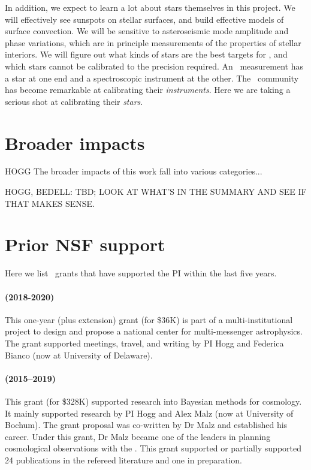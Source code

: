 \documentclass[12pt, letterpaper]{article}
\begin{document}
In addition, we expect to learn a lot about stars themselves in this project.
We will effectively see sunspots on stellar surfaces, and build effective models
of surface convection.
We will be sensitive to asteroseismic mode amplitude and phase variations, which
are in principle measurements of the properties of stellar interiors.
We will figure out what kinds of stars are the best targets for \EPRV, and which
stars cannot be calibrated to the precision required.
An \EPRV\ measurement has a star at one end and a spectroscopic instrument at the other.
The \EPRV\ community has become remarkable at calibrating their \emph{instruments}.
Here we are taking a serious shot at calibrating their \emph{stars}.

\section{Broader impacts}

HOGG The broader impacts of this work fall into various categories...

HOGG, BEDELL: TBD; LOOK AT WHAT'S IN THE SUMMARY AND SEE IF THAT MAKES SENSE.

\section{Prior NSF support}

Here we list \NSF\ grants that have supported the PI within the last five years.

\paragraph{
 (2018-2020)}
This one-year (plus extension) grant (for \$36K) is part of a multi-institutional project
to design and propose a national center for multi-messenger astrophysics. The grant supported
meetings, travel, and writing by PI Hogg and Federica Bianco (now at University of Delaware).

\paragraph{
(2015--2019)} This grant (for \$328K) supported research into Bayesian
methods for cosmology. It mainly supported research by PI Hogg and
Alex Malz (now at University of Bochum). The grant proposal was co-written
by Dr Malz and established his career.
Under this grant, Dr Malz became one of the leaders in planning cosmological
observations with the .
This grant supported or partially supported 24 publications
in the refereed literature and one in preparation.
\end{document}
